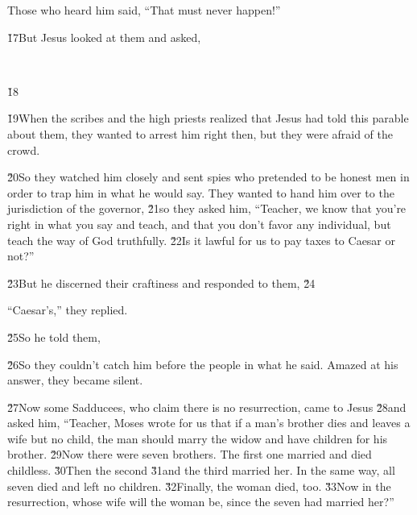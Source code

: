 Those who heard him said, ``That must never happen!''

\v{17}But Jesus looked at them and asked, 

\begin{poetry}
\poeml {} \\
\poemll    {}
\end{poetry}

\v{18}

\v{19}When the scribes and the high priests realized that Jesus had told this parable about them, they wanted to arrest him right then, but they were afraid of the crowd.

\v{20}So they watched him closely and sent spies who pretended to be honest men in order to trap him in what he would say. They wanted to hand him over to the jurisdiction of the governor, \v{21}so they asked him, ``Teacher, we know that you're right in what you say and teach, and that you don't favor any individual, but teach the way of God truthfully. \v{22}Is it lawful for us to pay taxes to Caesar or not?''

\v{23}But he discerned their craftiness and responded to them, \v{24}

``Caesar's,'' they replied.

\v{25}So he told them, 

\v{26}So they couldn't catch him before the people in what he said. Amazed at his answer, they became silent.

\v{27}Now some Sadducees, who claim there is no resurrection, came to Jesus \v{28}and asked him, ``Teacher, Moses wrote for us that if a man's brother dies and leaves a wife but no child, the man should marry the widow and have children for his brother. \v{29}Now there were seven brothers. The first one married and died childless. \v{30}Then the second \v{31}and the third married her. In the same way, all seven died and left no children. \v{32}Finally, the woman died, too. \v{33}Now in the resurrection, whose wife will the woman be, since the seven had married her?''

